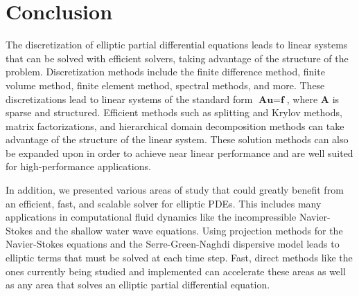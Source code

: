 \section{Conclusion}
\label{sec:conclusion}

The discretization of elliptic partial differential equations leads to linear systems that can be solved with efficient solvers, taking advantage of the structure of the problem. Discretization methods include the finite difference method, finite volume method, finite element method, spectral methods, and more. These discretizations lead to linear systems of the standard form $\textbf{A} \textbf{u} = \textbf{f}$, where $\textbf{A}$ is sparse and structured. Efficient methods such as splitting and Krylov methods, matrix factorizations, and hierarchical domain decomposition methods can take advantage of the structure of the linear system. These solution methods can also be expanded upon in order to achieve near linear performance and are well suited for high-performance applications.

In addition, we presented various areas of study that could greatly benefit from an efficient, fast, and scalable solver for elliptic PDEs. This includes many applications in computational fluid dynamics like the incompressible Navier-Stokes and the shallow water wave equations. Using projection methods for the Navier-Stokes equations and the Serre-Green-Naghdi dispersive model leads to elliptic terms that must be solved at each time step. Fast, direct methods like the ones currently being studied and implemented can accelerate these areas as well as any area that solves an elliptic partial differential equation.
